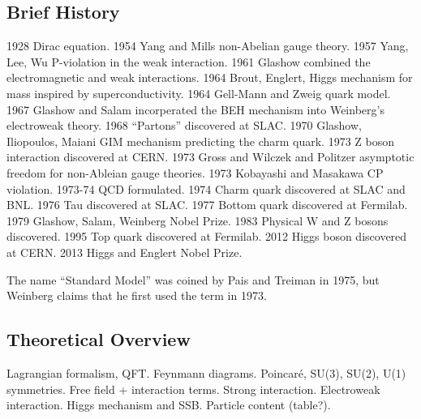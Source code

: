 \subsection{Brief History}
1928 Dirac equation.
1954 Yang and Mills non-Abelian gauge theory.
1957 Yang, Lee, Wu P-violation in the weak interaction.
1961 Glashow combined the electromagnetic and weak interactions.
1964 Brout, Englert, Higgs mechanism for mass inspired by superconductivity.
1964 Gell-Mann and Zweig quark model.
1967 Glashow and Salam incorperated the BEH mechanism into Weinberg's electroweak theory.
1968 ``Partons'' discovered at SLAC.
1970 Glashow, Iliopoulos, Maiani GIM mechanism predicting the charm quark.
1973 Z boson interaction discovered at CERN.
1973 Gross and Wilczek and Politzer asymptotic freedom for non-Ableian gauge theories.
1973 Kobayashi and Masakawa CP violation.
1973-74 QCD formulated.
1974 Charm quark discovered at SLAC and BNL.
1976 Tau discovered at SLAC.
1977 Bottom quark discovered at Fermilab.
1979 Glashow, Salam, Weinberg Nobel Prize.
1983 Physical W and Z bosons discovered.
1995 Top quark discovered at Fermilab.
2012 Higgs boson discovered at CERN.
2013 Higgs and Englert Nobel Prize.

The name ``Standard Model'' was coined by Pais and Treiman in 1975,
but Weinberg claims that he first used the term in 1973.

\subsection{Theoretical Overview}
Lagrangian formalism, QFT.
Feynmann diagrams.
Poincar\'{e}, SU(3), SU(2), U(1) symmetries.
Free field + interaction terms.
Strong interaction.
Electroweak interaction.
Higgs mechanism and SSB.
Particle content (table?).

